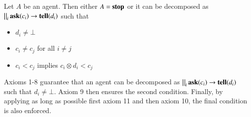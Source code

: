 \documentclass[main.tex]{subfiles}
\begin{document}
%
%
%

%
%

\begin{lemma}
Let $A$ be an agent. Then either $A = {\bf stop}$ or it can be decomposed as $\bigparallel_{i} {\bf ask}(c_i) \rightarrow {\bf tell}(d_i)$ such that 
\begin{itemize}
\item  $d_i \neq \bot$
\item  $c_i \neq c_j$ for all $i \neq j$
\item $c_i < c_j$ implies $c_i \otimes d_i < c_j$
\end{itemize}
\end{lemma}

Axioms 1-8 guarantee that an agent can be decomposed as $\bigparallel_{i} {\bf ask}(c_i) \rightarrow {\bf tell}(d_i)$
such that $d_i \neq \bot$. Axiom 9 then ensures the second condition. Finally, by applying as long as possible first axiom 11 
and then axiom 10, the final condition is also enforced.
\end{document}
